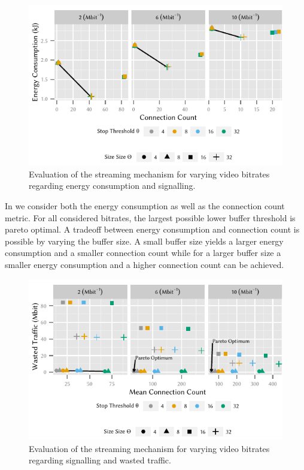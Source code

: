 \begin{figure}
  \centering
  \includegraphics{application/lte_video/trade_offs/figures/energy2connections}
  \caption{Evaluation of the streaming mechanism for varying video bitrates regarding energy consumption and signalling.}
  \label{fig:application:lte_video:numerical_evaluation:trade_offs:energy2connections}
\end{figure}

In  we consider both the energy consumption as well as the connection count metric.
For all considered bitrates, the largest possible lower buffer threshold is pareto optimal.
A tradeoff between energy consumption and connection count is possible by varying the buffer size.
A small buffer size yields a larger energy consumption and a smaller connection count while for a larger buffer size a smaller energy consumption and a higher connection count can be achieved.

\begin{figure}
  \centering
  \includegraphics{application/lte_video/trade_offs/figures/connections2lostData}
  \caption{Evaluation of the streaming mechanism for varying video bitrates regarding signalling and wasted traffic.}
  \label{fig:application:lte_video:numerical_evaluation:trade_offs:connections2lostData}
\end{figure}

